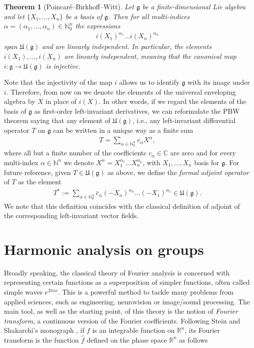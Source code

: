 \documentclass[12pt,oneside,a4paper]{book}
\numberwithin{equation}{section}     %
\theoremstyle{plain}
\newtheorem{theorem}{Theorem}[section]
\theoremstyle{definition}
\newcommand{\N}{{\mathbb N}}
\newcommand{\R}{{\mathbb R}}
\newcommand{\Rn}{{\R}^n}
\begin{document}
\begin{theorem}[Poincar\'e--Birkhoff--Witt]\label{PBW}
	Let $\mathfrak{g}$ be a finite-dimensional Lie algebra and let $\{X_1,\dots,X_n\}$ be a basis of $\mathfrak{g}$. Then for all multi-indices $\alpha=(\alpha_1,\dots,\alpha_n)\in\N^n_0$ the expressions
	\begin{align*}
	i(X_1)^{\alpha_1}\dots i(X_n)^{\alpha_n}
	\end{align*}
	span $\mathfrak{U}(\mathfrak{g})$ and are linearly independent. In particular, the elements $i(X_1),\dots,i(X_n)$ are linearly independent, meaning that the canonical map $i:\mathfrak{g}\rightarrow\mathfrak{U}(\mathfrak{g})$ is injective.
\end{theorem}
Note that the injectivity of the map $i$ allows us to identify $\mathfrak{g}$ with its image under $i$. Therefore, from now on we denote the elements of the universal enveloping algebra by $X$ in place of $i(X)$. In other words, if we regard the elements of the basis of $\mathfrak{g}$ as first-order left-invariant derivatives, we can reformulate the PBW theorem saying that any element of $\mathfrak{U}(\mathfrak{g})$, i.e., any left-invariant differential operator $T$ on $\mathfrak{g}$ can be written in a unique way as a finite sum
\begin{align*}
T=\sum_{\alpha\in\N^n_0}c_\alpha X^\alpha,
\end{align*} 
where all but a finite number of the coefficients $c_\alpha\in\mathbb{C}$ are zero and for every multi-index $\alpha\in\mathbb{N}^n$ we denote $X^\alpha=X_1^{\alpha_1}\dots X_n^{\alpha_n}$, with $X_1,\dots, X_n$ basis for $\mathfrak{g}$. For future reference, given $T\in \mathfrak{U}(\mathfrak{g})$ as above, we define the \textit{formal adjoint operator} of $T$ as the element
\begin{align}\label{formaladjoint}
T^*:=\sum_{\alpha\in\N^n_0}\bar{c}_\alpha(-X_n)^{\alpha_n}\dots(-X_1)^{\alpha_1}\in\mathfrak{U}(\mathfrak{g}).
\end{align} 
We note that this definition coincides with the classical definition of adjoint of the corresponding left-invariant vector fields.

\section{Harmonic analysis on groups}
Broadly speaking, the classical theory of Fourier analysis is concerned with representing certain functions as a superposition of simpler functions, often called simple waves $e^{2\pi ix}$. This is a powerful method to tackle many problems from applied sciences, such as engineering, neurovision or image/sound processing. The main tool, as well as the starting point, of this theory is the notion of \textit{Fourier transform}, a continuous version of the Fourier coefficients. Following Stein and Shakarchi's monograph \cite{SS2003}, if $f$ is an integrable function on $\Rn$, its Fourier transform is the function $\widehat{f}$ defined on the phase space $\Rn$ as follows
\end{document}
